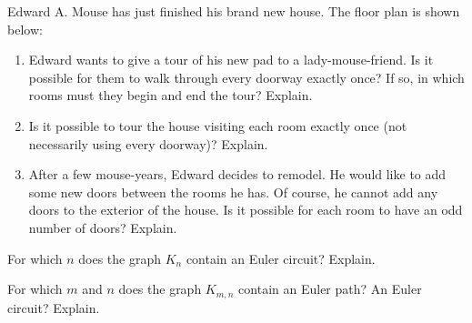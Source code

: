 \documentclass[10pt,]{book}
\theoremstyle{plain}
\theoremstyle{definition}
\theoremstyle{definition}
\theoremstyle{definition}
\theoremstyle{definition}
\numberwithin{equation}{chapter}
\begin{document}
\begin{divisionexercise}{3}\hypertarget{exercise-11}{}
\hypertarget{p-164}{}%
Edward A. Mouse has just finished his brand new house. The floor plan is shown below:%
\begin{sidebyside}{1}{0.26}{0.26}{0}
\begin{sbspanel}{0.48}
\end{sbspanel}
\end{sidebyside}
\par
\hypertarget{p-165}{}%
\leavevmode%
\begin{enumerate}[label=(\alph*)]
\item\hypertarget{li-60}{}\hypertarget{p-166}{}%
Edward wants to give a tour of his new pad to a lady-mouse-friend. Is it possible for them to walk through every doorway exactly once? If so, in which rooms must they begin and end the tour? Explain. %
\item\hypertarget{li-61}{}\hypertarget{p-167}{}%
Is it possible to tour the house visiting each room exactly once (not necessarily using every doorway)? Explain. %
\item\hypertarget{li-62}{}\hypertarget{p-168}{}%
After a few mouse-years, Edward decides to remodel. He would like to add some new doors between the rooms he has. Of course, he cannot add any doors to the exterior of the house. Is it possible for each room to have an odd number of doors? Explain. %
\end{enumerate}
%
\end{divisionexercise}%
\begin{divisionexercise}{4}\hypertarget{exercise-12}{}
\hypertarget{p-169}{}%
For which \(n\) does the graph \(K_n\) contain an Euler circuit? Explain.%
\end{divisionexercise}%
\begin{divisionexercise}{5}\hypertarget{exercise-13}{}
\hypertarget{p-171}{}%
For which \(m\) and \(n\) does the graph \(K_{m,n}\) contain an Euler path? An Euler circuit? Explain.%
\end{divisionexercise}%
\end{document}
